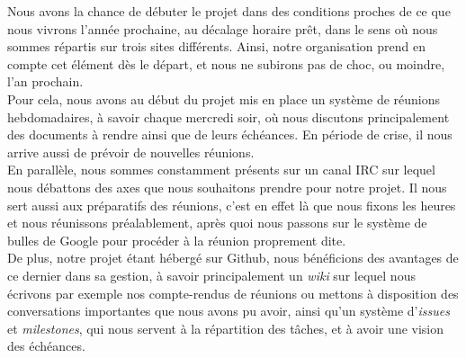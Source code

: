 Nous avons la chance de débuter le projet dans des conditions proches de ce que nous vivrons l'année prochaine, au décalage horaire prêt, dans le sens où nous sommes répartis sur trois sites différents. Ainsi, notre organisation prend en compte cet élément dès le départ, et nous ne subirons pas de choc, ou moindre, l'an prochain.\\

Pour cela, nous avons au début du projet mis en place un système de réunions hebdomadaires, à savoir chaque mercredi soir, où nous discutons principalement des documents à rendre ainsi que de leurs échéances. En période de crise, il nous arrive aussi de prévoir de nouvelles réunions.\\

En parallèle, nous sommes constamment présents sur un canal IRC sur lequel nous débattons des axes que nous souhaitons prendre pour notre projet. Il nous sert aussi aux préparatifs des réunions, c'est en effet là que nous fixons les heures et nous réunissons préalablement, après quoi nous passons sur le système de bulles de Google pour procéder à la réunion proprement dite.\\

De plus, notre projet étant hébergé sur Github, nous bénéficions des avantages de ce dernier dans sa gestion, à savoir principalement un \textit{wiki} sur lequel nous écrivons par exemple nos compte-rendus de réunions ou mettons à disposition des conversations importantes que nous avons pu avoir, ainsi qu'un système d'\textit{issues} et \textit{milestones}, qui nous servent à la répartition des tâches, et à avoir une vision des échéances.